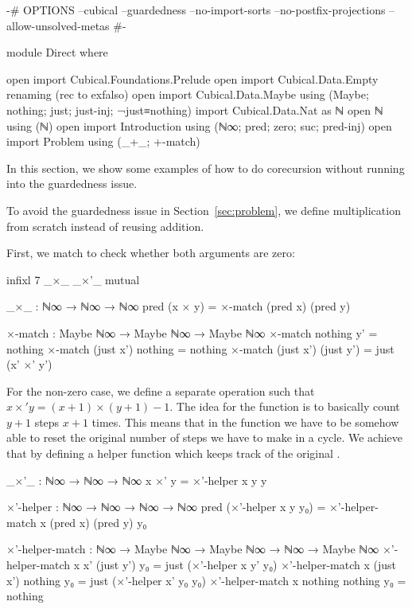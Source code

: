 \begin{code}[hide]
{-# OPTIONS --cubical --guardedness --no-import-sorts --no-postfix-projections --allow-unsolved-metas #-}

module Direct where

open import Cubical.Foundations.Prelude
open import Cubical.Data.Empty
  renaming (rec to exfalso)
open import Cubical.Data.Maybe using (Maybe; nothing; just; just-inj; ¬just≡nothing)
import Cubical.Data.Nat as ℕ
open ℕ using (ℕ)
open import Introduction using (ℕ∞; pred; zero; suc; pred-inj)
open import Problem using (_+_; +-match)
\end{code}
In this section, we show some examples of how to do corecursion without running
into the guardedness issue.

To avoid the guardedness issue in Section~\ref{sec:problem}, we define
multiplication from scratch instead of reusing addition.

First, we match to check whether both arguments are zero:
\begin{code}[hide]
infixl 7 _×_ _×'_
mutual
\end{code}
\begin{code}
  _×_ : ℕ∞ → ℕ∞ → ℕ∞
  pred (x × y) = ×-match (pred x) (pred y)

  ×-match : Maybe ℕ∞ → Maybe ℕ∞ → Maybe ℕ∞
  ×-match nothing    y'         = nothing
  ×-match (just x')  nothing    = nothing
  ×-match (just x')  (just y')  = just (x' ×' y')
\end{code}

For the non-zero case, we define a separate operation 
such that $x\times'y = (x+1)\times(y+1)-1$. The idea for the function is to basically
count $y+1$ steps $x+1$ times. This means that in the function we have to be somehow
able to reset the original number of steps we have to make in a cycle.
We achieve that by defining a helper function which keeps track of the original .

\begin{code}
  _×'_ : ℕ∞ → ℕ∞ → ℕ∞
  x ×' y = ×'-helper x y y

  ×'-helper : ℕ∞ → ℕ∞ → ℕ∞ → ℕ∞
  pred (×'-helper x y y₀) =
    ×'-helper-match x (pred x) (pred y) y₀

  ×'-helper-match :
    ℕ∞ → Maybe ℕ∞ → Maybe ℕ∞ → ℕ∞ →
    Maybe ℕ∞
  ×'-helper-match x x' (just y') y₀ =
    just (×'-helper x y' y₀)
  ×'-helper-match x (just x') nothing y₀ =
    just (×'-helper x' y₀ y₀)
  ×'-helper-match x nothing nothing y₀ =
    nothing
\end{code}

